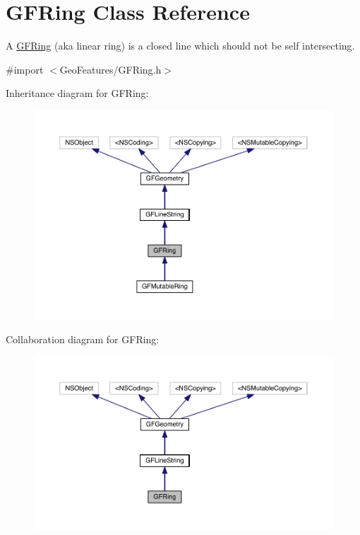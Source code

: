 \hypertarget{interface_g_f_ring}{}\section{G\+F\+Ring Class Reference}
\label{interface_g_f_ring}


A \hyperlink{interface_g_f_ring}{G\+F\+Ring} (aka linear ring) is a closed line which should not be self intersecting.  




{\ttfamily \#import $<$Geo\+Features/\+G\+F\+Ring.\+h$>$}



Inheritance diagram for G\+F\+Ring\+:
\nopagebreak
\begin{figure}[H]
\begin{center}
\leavevmode
\includegraphics[width=350pt]{interface_g_f_ring__inherit__graph}
\end{center}
\end{figure}


Collaboration diagram for G\+F\+Ring\+:
\nopagebreak
\begin{figure}[H]
\begin{center}
\leavevmode
\includegraphics[width=350pt]{interface_g_f_ring__coll__graph}
\end{center}
\end{figure}
